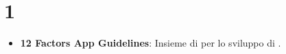 \section*{1}
\begin{itemize}
	\item
	\textbf{12 Factors App Guidelines}: Insieme di  per lo sviluppo di .
\end{itemize}
\newpage